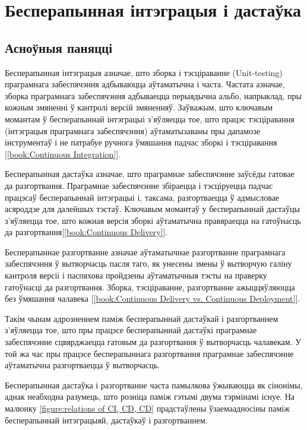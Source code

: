 \section{Бесперапынная інтэграцыя і дастаўка}

\subsection{Асноўныя паняцці}

Бесперапынная інтэграцыя азначае, што зборка і тэсціраванне (Unit-testing)
праграмнага забеспячэння адбываюцца аўтаматычна і часта.
Частата азначае, зборка праграмнага забеспячэння адбываецца перыядычна
альбо, напрыклад, пры кожным змяненні ў кантролі версій змяненняў.
Заўважым, што ключавым момантам ў бесперапыннай інтэграцыі з'яўляецца тое,
што працэс тэсціравання (інтэграцыя праграмнага забеспячэння) аўтаматызаваны
пры дапамозе інструментаў і не патрабуе ручнога ўмяшання падчас
зборкі і тэсціравання%
[\ref{book:Continuous Integration}].

Бесперапынная дастаўка азначае, што праграмнае забеспячэнне
заўсёды гатовае да разгортвання.
Праграмнае забеспячэнне збіраецца і тэсціруецца падчас працэсаў
бесперапыннай інтэграцыі і, таксама, разгортваецца ў адмысловае
асяроддзе для далейшых тэстаў.
Ключавым момантаў у бесперапыннай дастаўцы з'яўляецца тое,
што кожная версія зборкі аўтаматычна правяраецца на гатоўнасць да
разгортвання[\ref{book:Continuous Delivery}].

Бесперапыннае разгортванне азначае аўтаматычнае разгортванне
праграмнага забеспячэння ў вытворчасць пасля таго, як
унесены змены ў вытворчую галіну кантроля версіі і паспяхова пройдзены
аўтаматычныя тэсты на праверку гатоўнасці да разгортвання.
Зборка, тэсціраванне, разгортванне ажыццяўляюцца без ўмяшання чалавека%
[\ref{book:Continuous Delivery vs. Continuous Deployment}].

Такім чынам адрозненнем паміж бесперапыннай дастаўкай і разгортваннем
з'яўляецца тое, што пры працэсе бесперапыннай дастаўкі праграмнае
забеспячэнне сцвярджаецца гатовым да разгортвання ў вытворчасць чалавекам.
У той жа час пры працэсе бесперапыннага разгортвання праграмнае
забеспячэнне аўтаматычна разгортваецца ў вытворчасць.

Бесперапынная дастаўка і разгортванне часта памылкова ўжываюцца як
сінонімы, аднак неабходна разумець, што розніца паміж гэтымі двума
тэрмінамі існуе. На малюнку \ref{figure:relations of CI, CD, CD}
прадстаўлены ўзаемаадносіны паміж бесперапыннай інтэграцыяй, дастаўкаў і
разгортваннем.

